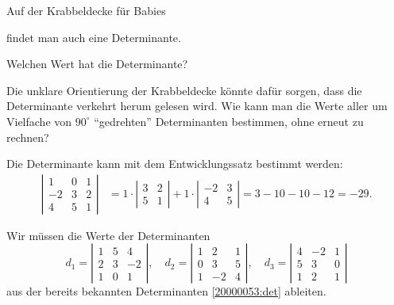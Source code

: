 Auf der Krabbeldecke für Babies
\begin{center}
\quad
{}
\end{center}
findet man auch eine Determinante.
\begin{teilaufgaben}
\item Welchen Wert hat die Determinante?
\item Die unklare Orientierung der Krabbeldecke könnte dafür sorgen, dass
die Determinante verkehrt herum gelesen wird.
Wie kann man die Werte aller um Vielfache von $90^\circ$ ``gedrehten''
Determinanten bestimmen, ohne erneut zu rechnen?
\end{teilaufgaben}

\begin{loesung}
\begin{teilaufgaben}
\item
Die Determinante kann mit dem Entwicklungssatz bestimmt werden:
\begin{align}
\left|\begin{matrix}
 1&0&1\\
-2&3&2\\
 4&5&1
\end{matrix}\right|
&=
1\cdot\left|\begin{matrix}3&2\\5&1\end{matrix}\right|
+
1\cdot\left|\begin{matrix}-2&3\\4&5\end{matrix}\right|
=
3-10 -10-12
=
-29.
\label{20000053:det}
\end{align}
\item
Wir müssen die Werte der Determinanten
\[
d_1
=
\left|\begin{matrix}
1&5& 4\\
2&3&-2\\
1&0& 1
\end{matrix}\right|,
\quad
d_2
=
\left|\begin{matrix}
1& 2&1\\
0& 3&5\\
1&-2&4
\end{matrix}\right|,
\quad
d_3
=
\left|\begin{matrix}
4&-2&1\\
5& 3&0\\
1& 2&1
\end{matrix}\right|
\]
aus der bereits bekannten Determinanten \eqref{20000053:det} ableiten.


\end{teilaufgaben}
\end{loesung}
